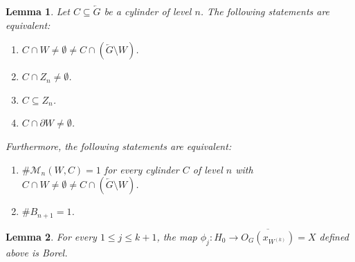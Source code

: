 \documentclass[10pt,a4paper]{amsart}
\newtheorem{lemma}{Lemma}
\newcommand{\tm}{\subseteq}
\begin{document}
\begin{lemma}\label{lem: chara nonempty intersect with W and complement}
    Let $C\tm \overleftarrow{G}$ be a cylinder of level $n$.
    The following statements are equivalent:
    \begin{enumerate}
        \item $C\cap W\neq \emptyset \neq  C\cap (\overleftarrow{G}\setminus W)$.
        \item $C\cap Z_n \neq \emptyset$.
        \item $C\tm Z_n$.
        \item $C\cap \partial W\neq \emptyset$.
    \end{enumerate}
    Furthermore, the following statements are equivalent:
    \begin{enumerate}
        \item $\#\mathcal{M}_n(W,C)=1$ for every cylinder $C$ of level $n$ with $C\cap W\neq \emptyset \neq  C\cap (\overleftarrow{G}\setminus W)$.
        \item $\# B_{n+1} =1$.
    \end{enumerate}
\end{lemma}

\begin{lemma}\label{Borel_map}
For every $1\leq j\leq k+1$, the map $\phi_j:H_0\to \overline{O_G(x_{W^{(k)}})}=X$ defined above 
is Borel.
\end{lemma}
\end{document}
